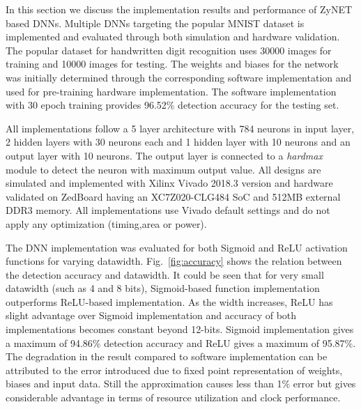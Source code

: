 In this section we discuss the implementation results and performance of ZyNET based DNNs.
Multiple DNNs targeting the popular MNIST dataset is implemented and evaluated through both simulation and hardware validation.
The popular dataset for handwritten digit recognition uses 30000 images for training and 10000 images for testing.
The weights and biases for the network was initially determined through the corresponding software implementation and used for pre-training hardware implementation.
The software implementation with 30 epoch training provides 96.52\% detection accuracy for the testing set.

All implementations follow a 5 layer architecture with 784 neurons in input layer, 2 hidden layers with 30 neurons each and 1 hidden layer with 10 neurons and an output layer with 10 neurons.
The output layer is connected to a \emph{hardmax} module to detect the neuron with maximum output value.
All designs are simulated and implemented with Xilinx Vivado 2018.3 version and hardware validated on ZedBoard having an XC7Z020-CLG484 SoC and 512MB external DDR3 memory. 
All implementations use Vivado default settings and do not apply any optimization (timing,area or power). 

The DNN implementation was evaluated for both Sigmoid and ReLU activation functions for varying datawidth.
Fig.~\ref{fig:accuracy} shows the relation between the detection accuracy and datawidth.
It could be seen that for very small datawidth (such as 4 and 8 bits), Sigmoid-based function implementation outperforms ReLU-based implementation.
As the width increases, ReLU has slight advantage over Sigmoid implementation and accuracy of both implementations becomes constant beyond 12-bits.
Sigmoid implementation gives a maximum of 94.86\% detection accuracy and ReLU gives a maximum of 95.87\%.
The degradation in the result compared to software implementation can be attributed to the error introduced due to fixed point representation of weights, biases and input data.
Still the approximation causes less than 1\% error but gives considerable advantage in terms of resource utilization and clock performance.

